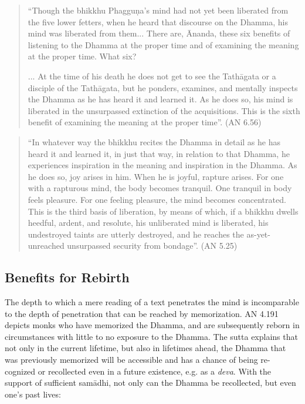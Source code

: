 \begin{quote}
  ``Though the bhikkhu Phagguṇa's mind had not yet been liberated from the five lower fetters, when he heard that discourse on the Dhamma, his mind was liberated from them... There are, Ānanda, these six benefits of listening to the Dhamma at the proper time and of examining the meaning at the proper time. What six?

  ... At the time of his death he does not get to see the Tathāgata or a disciple of the Tathāgata, but he ponders, examines, and mentally inspects the Dhamma as he has heard it and learned it. As he does so, his mind is liberated in the unsurpassed extinction of the acquisitions. This is the sixth benefit of examining the meaning at the proper time''. (AN 6.56)
\end{quote}

\begin{quote}
  ``In whatever way the bhikkhu recites the Dhamma in detail as he has heard it and learned it, in just that way, in relation to that Dhamma, he experiences inspiration in the meaning and inspiration in the Dhamma. As he does so, joy arises in him. When he is joyful, rapture arises. For one with a rapturous mind, the body becomes tranquil. One tranquil in body feels pleasure. For one feeling pleasure, the mind becomes concentrated. This is the third basis of liberation, by means of which, if a bhikkhu dwells heedful, ardent, and resolute, his unliberated mind is liberated, his undestroyed taints are utterly destroyed, and he reaches the as-yet-unreached unsurpassed security from bondage''. (AN 5.25)
\end{quote}

\subsection*{Benefits for Rebirth}

The depth to which a mere reading of a text penetrates the mind is incomparable to the depth of penetration that can be reached by memorization. AN 4.191 depicts monks who have memorized the Dhamma, and are subsequently reborn in circumstances with little to no exposure to the Dhamma. The sutta explains that not only in the current lifetime, but also in lifetimes ahead, the Dhamma that was previously memorized will be accessible and has a chance of being re-cognized or recollected even in a future existence, e.g. as a \textit{deva}. With the support of sufficient samādhi, not only can the Dhamma be recollected, but even one's past lives:

